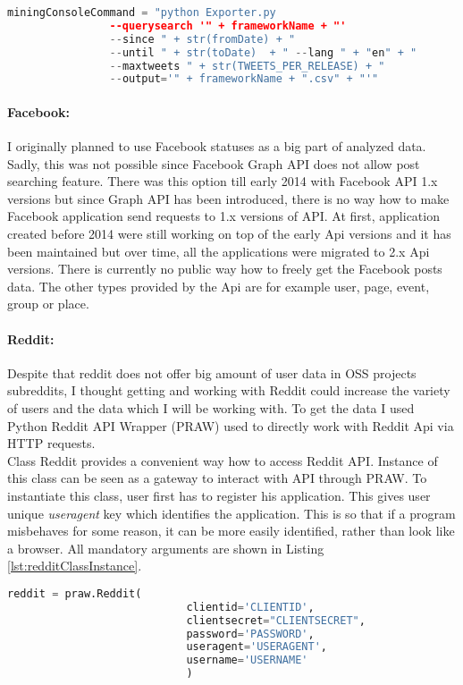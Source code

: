 \begin{lstlisting}[caption={Creating command to get Tweets about a project version in particular time interval around release date},label={lst:beforeAfterReleaseDatesScript},language=Python]
miningConsoleCommand = "python Exporter.py 
				--querysearch '" + frameworkName + "' 
				--since " + str(fromDate) + " 
				--until " + str(toDate)  + " --lang " + "en" + " 
				--maxtweets " + str(TWEETS_PER_RELEASE) + " 
				--output='" + frameworkName + ".csv" + "'"
\end{lstlisting}


\paragraph{Facebook:}
I originally planned to use Facebook statuses as a big part of analyzed data. Sadly, this was not possible since Facebook Graph API does not allow post searching feature. There was this option till early 2014 with Facebook API 1.x versions but since Graph API has been introduced, there is no way how to make Facebook application send requests to 1.x versions of API. At first, application created before 2014 were still working on top of the early Api versions and it has been maintained but over time, all the applications were migrated to 2.x Api versions. There is currently no public way how to freely get the Facebook posts data. The other types provided by the Api are for example user, page, event, group or place.

\paragraph{Reddit:}
Despite that reddit does not offer big amount of user data in OSS projects subreddits, I thought getting and working with Reddit could increase the variety of users and the data which I will be working with. To get the data I used Python Reddit API Wrapper (PRAW) used to directly work with Reddit Api via HTTP requests.\\
Class Reddit provides a convenient way how to access Reddit API. Instance of this class can be seen as a gateway to interact with API through PRAW. To instantiate this class, user first has to register his application. This gives user unique \textit{useragent} key which identifies the application. This is so that if a program misbehaves for some reason, it can be more easily identified, rather than look like a browser. All mandatory arguments are shown in Listing \ref{lst:redditClassInstance}.
\newpage
\begin{lstlisting}[caption={Instantiating Reddit class object},label={lst:redditClassInstance},language=Python]
reddit = praw.Reddit(
							clientid='CLIENTID',
							clientsecret="CLIENTSECRET", 				
							password='PASSWORD',
							useragent='USERAGENT',
							username='USERNAME'
							)
\end{lstlisting}

